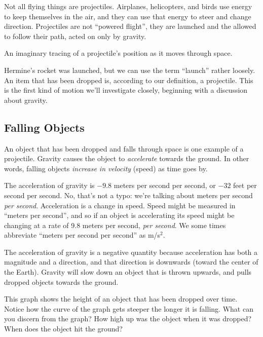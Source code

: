Not all flying things are projectiles. Airplanes, helicopters, and birds use energy to keep themselves in the air, and they can use that energy to steer and change direction. Projectiles are not ``powered flight'', they are launched and the allowed to follow their path, acted on only by gravity.

\begin{boxdef}[Trajectory]
An imaginary tracing of a projectile's position as it moves through space.
\end{boxdef}

Hermine's rocket was launched, but we can use the term ``launch'' rather loosely. An item that has been dropped is, according to our definition, a projectile. This is the first kind of motion we'll investigate closely, beginning with a discussion about gravity.

\subsection{Falling Objects}

An object that has been dropped and falls through space is one example of a projectile. Gravity causes the object to \textit{accelerate} towards the ground. In other words, falling objects \textit{increase in velocity} (speed) as time goes by.

The acceleration of gravity is $-9.8$ meters per second per second, or $-32$ feet per second per second. No, that's not a typo: we're talking about meters per second \textit{per second}. Acceleration is a change in speed. Speed might be measured in ``meters per second'', and so if an object is accelerating its speed might be changing at a rate of 9.8 meters per second, \textit{per second}. We some times abbreviate ``meters per second per second'' as m/s$^2$.

The acceleration of gravity is a negative quantity because acceleration has both a magnitude and a direction, and that direction is downwards (toward the center of the Earth). Gravity will slow down an object that is thrown upwards, and pulls dropped objects towards the ground.

This graph shows the height of an object that has been dropped over time. Notice how the curve of the graph gets steeper the longer it is falling. What can you discern from the graph? How high up was the object when it was dropped? When does the object hit the ground?

\begin{figure}
\end{figure}

